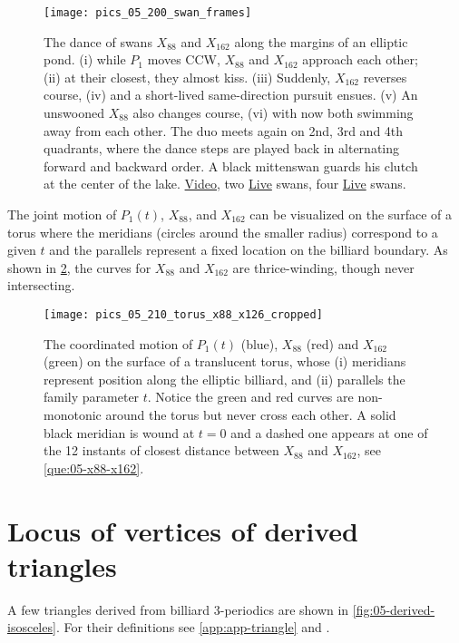 \begin{figure}
    \centering
    \texttt{[image: pics\_05\_200\_swan\_frames]}
    \caption{The dance of swans $X_{88}$ and $X_{162}$ along the margins of an elliptic pond. (i) while $P_1$ moves CCW, $X_{88}$ and $X_{162}$ approach each other; (ii) at their closest, they almost kiss. (iii) Suddenly, $X_{162}$ reverses course, (iv) and a short-lived same-direction pursuit ensues. (v) An unswooned $X_{88}$ also changes course, (vi) with now both swimming away from each other. The duo meets again on 2nd, 3rd and 4th quadrants, where the dance steps are played back in alternating forward and backward order. A black mittenswan guards his clutch at the center of the lake. \href{https://youtu.be/ljGTtA1x-Sk}{Video}, two \href{https://bit.ly/3f6M9Wh}{Live} swans, four \href{https://bit.ly/3oDhMdd}{Live} swans.}
    \label{fig:x88-x162}
\end{figure}

The joint motion of $P_1(t)$, $X_{88}$, and $X_{162}$ can be visualized on the surface of a torus where the meridians (circles around the smaller radius) correspond to a given $t$ and the parallels represent a fixed location on the billiard boundary. As shown in \cref{fig:05-3d-torus}, the curves for $X_{88}$ and $X_{162}$ are thrice-winding, though never intersecting.

\begin{figure}
    \centering
    \texttt{[image: pics\_05\_210\_torus\_x88\_x126\_cropped]}
    \caption{The coordinated motion of $P_1(t)$ (blue), $X_{88}$ (red) and $X_{162}$ (green) on the surface of a translucent torus, whose (i) meridians represent position along the elliptic billiard, and (ii) parallels the family parameter $t$. Notice the green and red curves are non-monotonic around the torus but never cross each other. A solid black meridian is wound at $t=0$ and a dashed one appears at one of the 12 instants of closest distance between $X_{88}$ and $X_{162}$, see \cref{que:05-x88-x162}.}
    \label{fig:05-3d-torus}
\end{figure}

\section{Locus of vertices of derived triangles}

A few triangles derived from billiard 3-periodics are shown in \cref{fig:05-derived-isosceles}. For their definitions see \cref{app:app-triangle} and \cite{mw}.

